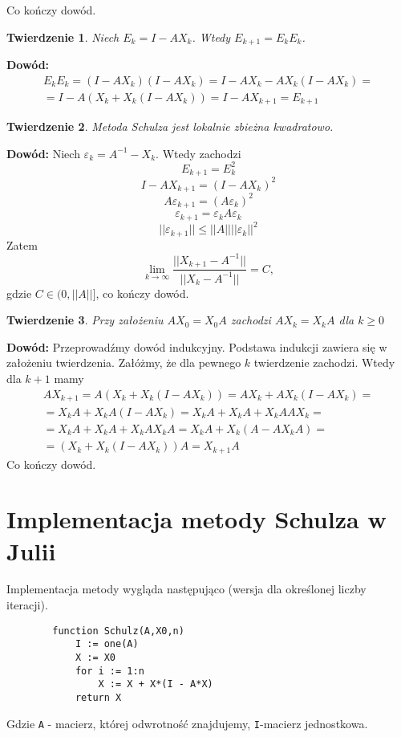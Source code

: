 \documentclass[11pt,a4paper]{article}
\newtheorem{twr}{Twierdzenie}
\begin{document}
    Co kończy dowód.
    
    \begin{twr}
        Niech $E_k = I - AX_k$. Wtedy $E_{k+1}=E_kE_k$.
    \end{twr}
    \textbf{Dowód:}
    \begin{multline*}
        E_kE_k = (I-AX_k)(I-AX_k) = I-AX_k - AX_k(I-AX_k) =\\
        = I - A(X_k + X_k(I-AX_k)) = I - AX_{k+1} = E_{k+1}
    \end{multline*}
    
    \begin{twr}
        Metoda Schulza jest lokalnie zbieżna kwadratowo.
    \end{twr}

    \textbf{Dowód:}
    Niech $\varepsilon_k = A^{-1} - X_k$. Wtedy zachodzi
    $$E_{k+1} = E_k^2$$
    $$I - AX_{k+1} = (I - AX_k)^2$$
    $$A\varepsilon_{k+1} = (A\varepsilon_k)^2$$
    $$\varepsilon_{k+1} = \varepsilon_kA\varepsilon_k$$
    $$||\varepsilon_{k+1}|| \leq ||A|| ||\varepsilon_k||^2$$
    Zatem
    $$ \lim_{k \to \infty} \frac{||X_{k+1}-A^{-1}||}{||X_k-A^{-1}||} = C,$$
    gdzie $C \in (0,||A||]$, co kończy dowód.

 
    \begin{twr}
        Przy założeniu $AX_0=X_0A$ zachodzi $AX_k=X_kA$ dla $k \ge 0$
    \end{twr}
    \textbf{Dowód:}
    Przeprowadźmy dowód indukcyjny. Podstawa indukcji zawiera się w założeniu twierdzenia. Załóżmy, że dla pewnego $k$ twierdzenie zachodzi. Wtedy dla $k+1$ mamy
    \begin{multline*}
        AX_{k+1} = A(X_k + X_k(I-AX_k)) = AX_k + AX_k(I-AX_k) =\\= X_kA+X_kA(I-AX_k) = X_kA+X_kA + X_kAAX_k =\\= X_kA+X_kA + X_kAX_kA = X_kA + X_k(A-AX_kA) =\\= (X_k+X_k(I-AX_k))A =X_{k+1}A
    \end{multline*}
    Co kończy dowód.

    \section{Implementacja metody Schulza w Julii}

    Implementacja metody wygląda następująco (wersja dla określonej liczby iteracji).

    \begin{verbatim}
        function Schulz(A,X0,n)
            I := one(A)
            X := X0
            for i := 1:n
                X := X + X*(I - A*X)
            return X
    \end{verbatim}
    Gdzie \verb!A! - macierz, której odwrotność znajdujemy, \verb!I!-macierz jednostkowa.
\end{document}
